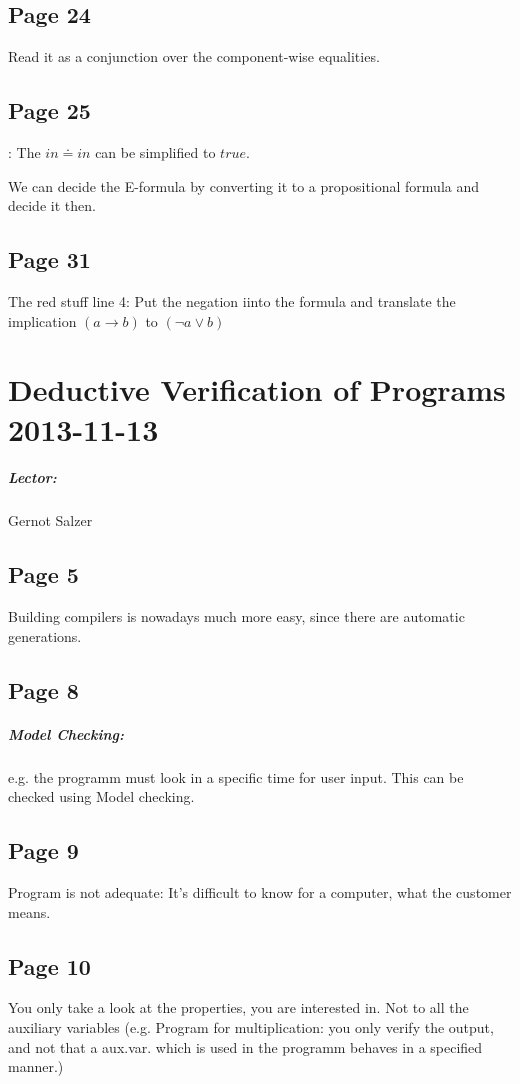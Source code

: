 \documentclass[a4paper]{article}
\begin{document}
\subsection{Page 24} Read it as a conjunction over the component-wise
equalities.

\subsection{Page 25}: The $in \doteq in$ can be simplified to $true$.

We can decide the E-formula by converting it to a propositional formula and
decide it then.


\subsection{Page 31}
The red stuff line 4: Put the negation iinto the formula and translate the
implication $( a \rightarrow b )$ to $(\neg a \vee b)$ 



\section{Deductive Verification of Programs 2013-11-13}
\subparagraph{Lector: }Gernot Salzer

\subsection{Page 5}
Building compilers is nowadays much more easy, since there are automatic
generations.

\subsection{Page 8}
\subparagraph{Model Checking:} e.g. the programm must look in a specific time
for user input. This can be checked using Model checking.


\subsection{Page 9}
Program is not adequate: It's difficult to know for a computer, what the
customer means.

\subsection{Page 10}
You only take a look at the properties, you are interested in. Not to all the
auxiliary variables (e.g. Program for multiplication: you only verify the
output, and not that a aux.var. which is used in the programm behaves in a
specified manner.)
\end{document}

